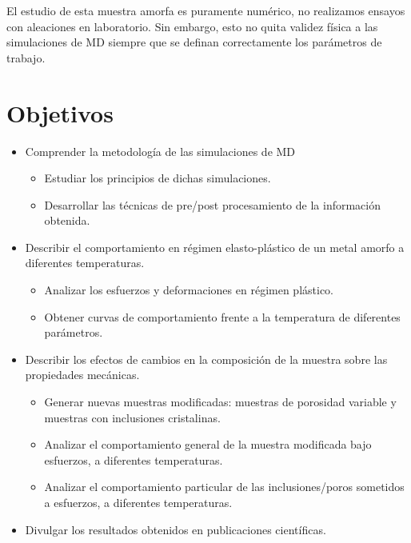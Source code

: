 El estudio de esta muestra amorfa es puramente numérico, no realizamos ensayos con aleaciones en laboratorio. Sin embargo, esto no quita validez física a las simulaciones de MD siempre que se definan correctamente los parámetros de trabajo.



\section{Objetivos}
\label{S1_8}

\begin{itemize}
 \item Comprender la metodología de las simulaciones de MD
 \begin{itemize}
  \item Estudiar los principios de dichas simulaciones.
  \item Desarrollar las técnicas de pre/post procesamiento de la información obtenida.
 \end{itemize}
 \item Describir el comportamiento en régimen elasto-plástico de un metal amorfo a diferentes temperaturas.
 \begin{itemize}
  \item Analizar los esfuerzos y deformaciones en régimen plástico.
  \item Obtener curvas de comportamiento frente a la temperatura de diferentes parámetros.
 \end{itemize}
 \item Describir los efectos de cambios en la composición de la muestra sobre las propiedades mecánicas.
 \begin{itemize}
  \item Generar nuevas muestras modificadas: muestras de porosidad variable y muestras con inclusiones cristalinas.
  \item Analizar el comportamiento general de la muestra modificada bajo esfuerzos, a diferentes temperaturas.
  \item Analizar el comportamiento particular de las inclusiones/poros sometidos a esfuerzos, a diferentes temperaturas.
 \end{itemize}
 \item Divulgar los resultados obtenidos en publicaciones científicas.
\end{itemize}

